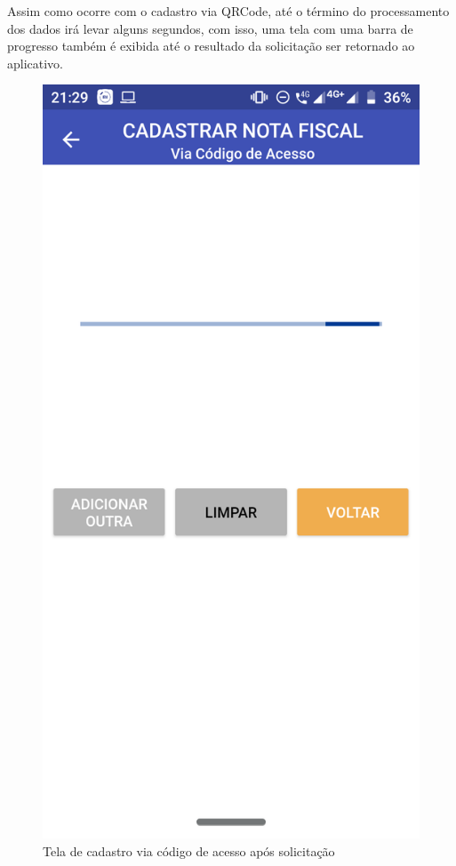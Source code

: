 Assim como ocorre com o cadastro via QRCode, até o término do processamento dos dados irá levar alguns segundos, com isso, uma tela com uma barra de progresso também é exibida até o resultado da solicitação ser retornado ao aplicativo.

\newpage
\begin{figure}[h]
    \centering
    \includegraphics[scale=0.15]{tcc/figures/app/app_codigo_acesso_loading_solicitacao.png}
    \caption{Tela de cadastro via código de acesso após solicitação}
    \label{appCodigoAcessoLoadingSolicitacaoFig}
\end{figure}


